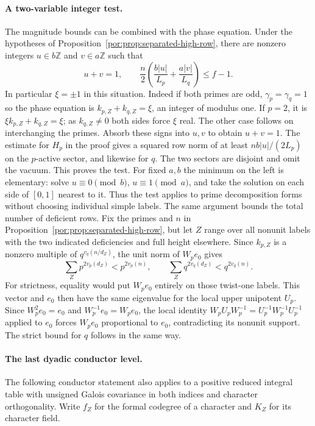 \documentclass[11pt,a4paper]{article}
\numberwithin{equation}{section}
\theoremstyle{remark}
\newcommand{\ZZ}{\mathbb Z}
\begin{document}
\paragraph{A two-variable integer test.}
The magnitude bounds can be combined with the phase equation. Under the hypotheses of Proposition~\ref{por:prop:separated-high-row}, there are nonzero integers $u\in b\ZZ$ and $v\in a\ZZ$ such that
\[
           u+v=1,\qquad
           \frac n2\left(\frac{b|u|}{L_p}+\frac{a|v|}{L_q}\right)
                   \le f-1 .
\]
In particular $\xi=\pm1$ in this situation. Indeed if both primes are odd, $\gamma_p=\gamma_q=1$ so the phase equation is $k_{p,Z}+k_{q,Z}=\xi$, an integer of modulus one. If $p=2$, it is $\xi k_{p,Z}+k_{q,Z}=\xi$; as $k_{q,Z}\ne0$ both sides force $\xi$ real. The other case follows on interchanging the primes. Absorb these signs into $u,v$ to obtain $u+v=1$. The estimate for $H_p$ in the proof gives a squared row norm of at least $nb|u|/(2L_p)$ on the $p$-active sector, and likewise for $q$. The two sectors are disjoint and omit the vacuum. This proves the test. For fixed $a,b$ the minimum on the left is elementary: solve $u\equiv0\pmod b$, $u\equiv1\pmod a$, and take the solution on each side of $[0,1]$ nearest to it. Thus the test applies to prime decomposition forms without choosing individual simple labels.
The same argument bounds the total number of deficient rows. Fix the primes and $n$ in Proposition~\ref{por:prop:separated-high-row}, but let $Z$ range over all nonunit labels with the two indicated deficiencies and full height elsewhere. Since $k_{p,Z}$ is a nonzero multiple of $q^{v_q(n/d_Z)}$, the unit norm of $W_pe_0$ gives
\[
           \sum_Z p^{2v_p(d_Z)}<p^{2v_p(n)},\qquad
           \sum_Z q^{2v_q(d_Z)}<q^{2v_q(n)} .
\]
For strictness, equality would put $W_pe_0$ entirely on those twist-one labels. This vector and $e_0$ then have the same eigenvalue for the local upper unipotent $U_p$. Since $W_p^2e_0=e_0$ and $W_p^{-1}e_0=W_pe_0$, the local identity $W_p U_p W_p^{-1}=U_p^{-1}W_p^{-1}U_p^{-1}$ applied to $e_0$ forces $W_pe_0$ proportional to $e_0$, contradicting its nonunit support. The strict bound for $q$ follows in the same way.

\paragraph{The last dyadic conductor level.}
The following conductor statement also applies to a positive reduced integral table with unsigned Galois covariance in both indices and character orthogonality. Write $f_Z$ for the formal codegree of a character and $K_Z$ for its character field.
\end{document}
